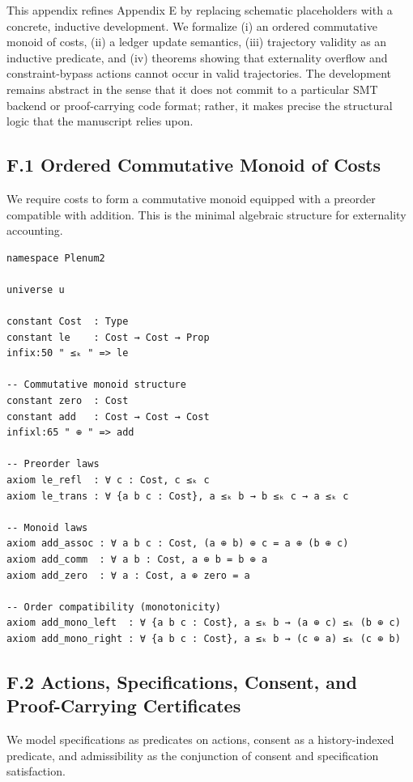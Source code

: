 \documentclass[11pt,oneside]{article}
\begin{document}
This appendix refines Appendix E by replacing schematic placeholders with a concrete, inductive development. We formalize (i) an ordered commutative monoid of costs, (ii) a ledger update semantics, (iii) trajectory validity as an inductive predicate, and (iv) theorems showing that externality overflow and constraint-bypass actions cannot occur in valid trajectories. The development remains abstract in the sense that it does not commit to a particular SMT backend or proof-carrying code format; rather, it makes precise the structural logic that the manuscript relies upon.

\subsection{F.1 Ordered Commutative Monoid of Costs}

We require costs to form a commutative monoid equipped with a preorder compatible with addition. This is the minimal algebraic structure for externality accounting.

\begin{verbatim}
namespace Plenum2

universe u

constant Cost  : Type
constant le    : Cost → Cost → Prop
infix:50 " ≤ₖ " => le

-- Commutative monoid structure
constant zero  : Cost
constant add   : Cost → Cost → Cost
infixl:65 " ⊕ " => add

-- Preorder laws
axiom le_refl  : ∀ c : Cost, c ≤ₖ c
axiom le_trans : ∀ {a b c : Cost}, a ≤ₖ b → b ≤ₖ c → a ≤ₖ c

-- Monoid laws
axiom add_assoc : ∀ a b c : Cost, (a ⊕ b) ⊕ c = a ⊕ (b ⊕ c)
axiom add_comm  : ∀ a b : Cost, a ⊕ b = b ⊕ a
axiom add_zero  : ∀ a : Cost, a ⊕ zero = a

-- Order compatibility (monotonicity)
axiom add_mono_left  : ∀ {a b c : Cost}, a ≤ₖ b → (a ⊕ c) ≤ₖ (b ⊕ c)
axiom add_mono_right : ∀ {a b c : Cost}, a ≤ₖ b → (c ⊕ a) ≤ₖ (c ⊕ b)
\end{verbatim}

\subsection{F.2 Actions, Specifications, Consent, and Proof-Carrying Certificates}

We model specifications as predicates on actions, consent as a history-indexed predicate, and admissibility as the conjunction of consent and specification satisfaction.
\end{document}
